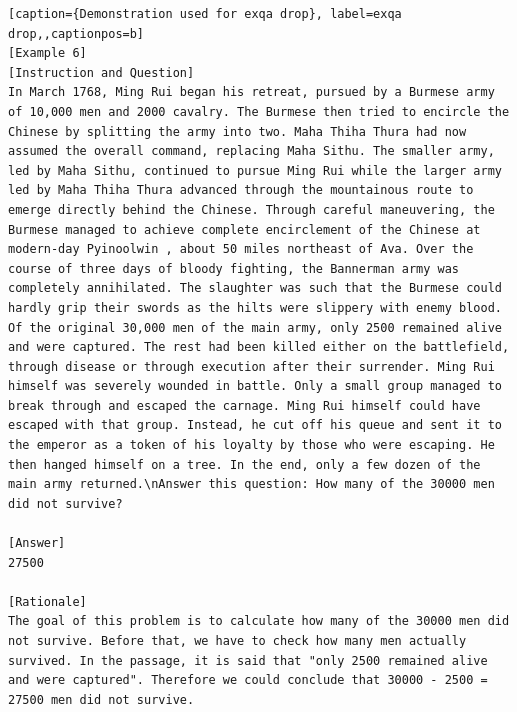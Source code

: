 \begin{lstlisting}[caption={Demonstration used for exqa drop}, label=exqa drop,,captionpos=b]
[Example 6]
[Instruction and Question]
In March 1768, Ming Rui began his retreat, pursued by a Burmese army of 10,000 men and 2000 cavalry. The Burmese then tried to encircle the Chinese by splitting the army into two. Maha Thiha Thura had now assumed the overall command, replacing Maha Sithu. The smaller army, led by Maha Sithu, continued to pursue Ming Rui while the larger army led by Maha Thiha Thura advanced through the mountainous route to emerge directly behind the Chinese. Through careful maneuvering, the Burmese managed to achieve complete encirclement of the Chinese at modern-day Pyinoolwin , about 50 miles northeast of Ava. Over the course of three days of bloody fighting, the Bannerman army was completely annihilated. The slaughter was such that the Burmese could hardly grip their swords as the hilts were slippery with enemy blood. Of the original 30,000 men of the main army, only 2500 remained alive and were captured. The rest had been killed either on the battlefield, through disease or through execution after their surrender. Ming Rui himself was severely wounded in battle. Only a small group managed to break through and escaped the carnage. Ming Rui himself could have escaped with that group. Instead, he cut off his queue and sent it to the emperor as a token of his loyalty by those who were escaping. He then hanged himself on a tree. In the end, only a few dozen of the main army returned.\nAnswer this question: How many of the 30000 men did not survive?

[Answer] 
27500

[Rationale]
The goal of this problem is to calculate how many of the 30000 men did not survive. Before that, we have to check how many men actually survived. In the passage, it is said that "only 2500 remained alive and were captured". Therefore we could conclude that 30000 - 2500 = 27500 men did not survive.




\end{lstlisting}
